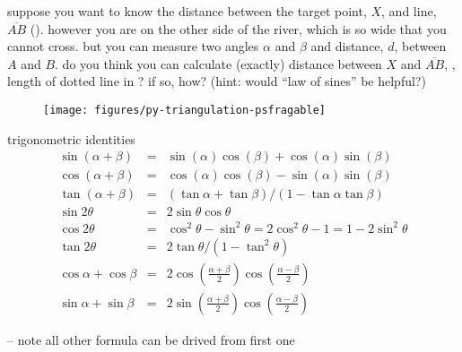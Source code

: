 \documentclass[17pt,landscape]{foils}
\begin{document}
{{

\bit
\item
	suppose you want to know the distance between the target point, $X$, and line, $\overline{AB}$ ().
	however you are on the other side of the river,
	which is so wide that you cannot cross.
	but you can measure two angles $\alpha$ and $\beta$ and distance, $d$, between $A$ and $B$.
\vitem
	do you think you can calculate (exactly) distance between $X$ and $\overline{AB}$,
	\ie, length of dotted line in ?
	if so, how?
	(hint: would ``law of sines'' be helpful?)
\eit

\begin{figure}
\begin{center}
	\texttt{[image: figures/py-triangulation-psfragable]}%
		\label{fig:triangulation}
\end{center}
\end{figure}



\begin{myformula}{trigonometric identities}
	\begin{eqnarray*}
		\sin(\alpha + \beta) &=& \sin(\alpha)\cos(\beta) + \cos(\alpha)\sin(\beta)
	\\
		\cos(\alpha + \beta) &=& \cos(\alpha)\cos(\beta) - \sin(\alpha)\sin(\beta)
	\\
		\tan(\alpha + \beta) &=& (\tan\alpha + \tan \beta) / (1-\tan\alpha\tan\beta)
	\\
		\sin 2\theta
	&=&
					2\sin\theta\cos\theta
	\\
		\cos 2\theta
	&=&
					\cos^2\theta- \sin^2\theta = 2\cos^2\theta - 1 = 1-2\sin^2\theta
	\\
		\tan2\theta &=& 2\tan\theta / (1-\tan^2\theta)
	\\
		\cos \alpha + \cos \beta
	&=&
					2\cos \left(\frac{\alpha + \beta}{2}\right) \cos \left(\frac{\alpha - \beta}{2}\right)
	\\
		\sin \alpha + \sin \beta
	&=&
					2\sin \left(\frac{\alpha + \beta}{2}\right) \cos \left(\frac{\alpha - \beta}{2}\right)
	\end{eqnarray*}
\end{myformula}

-- note all other formula can be drived from first one
\fi
}{%
}
}{}
\end{document}

